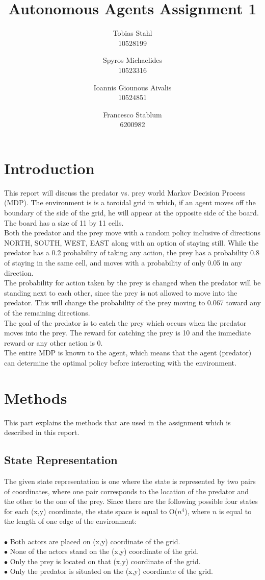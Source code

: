 \documentclass[11pt]{article}
\title{
	\textbf{Autonomous Agents Assignment 1}
}
\author{Tobias Stahl \\ 10528199 \and Spyros Michaelides \\ 10523316 \and Ioannis Giounous Aivalis \\ 10524851 \and Francesco Stablum \\ 6200982}
\begin{document}
\maketitle

\section{Introduction}
This report will discuss the predator vs. prey world Markov Decision Process (MDP). The environment is is a toroidal grid in which, if an agent moves off the boundary of the side of the grid, he will appear at the opposite side of the board. The board has a size of 11 by 11 cells.\\
Both the predator and the prey move with a random policy inclusive of directions NORTH, SOUTH, WEST, EAST along with an option of staying still. While the predator has a 0.2 probability of taking any action, the prey has a probability 0.8 of staying in the same cell, and moves with a probability of only 0.05 in any direction.\\
The probability for action taken by the prey is changed when the predator will be standing next to each other, since the prey is not allowed to move into the predator. This will change the probability of the prey moving to 0.067 toward any of the remaining directions.\\
The goal of the predator is to catch the prey which occurs when the predator moves into the prey. The reward for catching the prey is 10 and the immediate reward or any other action is 0.\\
The entire MDP is known to the agent, which means that the agent (predator) can determine the optimal policy before interacting with the environment.


\section{Methods}
This part explains the methods that are used in the assignment which is described in this report.


\subsection{State Representation}
The given state representation is one where the state is represented by two pairs of coordinates, where one pair corresponds to the location of the predator and the other to the one of the prey. Since there are the following possible four states for each (x,y) coordinate, the state space is equal to O($n^4$), where $n$ is equal to the length of one edge of the environment:\\\\
$\bullet$ Both actors are placed on (x,y) coordinate of the grid.\\
$\bullet$ None of the actors stand on the (x,y) coordinate of the grid.\\
$\bullet$ Only the prey is located on that (x,y) coordinate of the grid.\\
$\bullet$ Only the predator is situated on the (x,y) coordinate of the grid.
\end{document}
